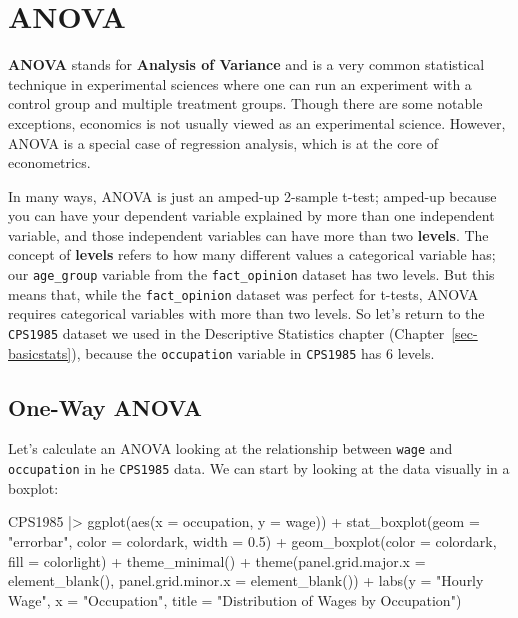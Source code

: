 \documentclass[
  letterpaper,
]{book}
\newenvironment{Shaded}{\begin{snugshade}}{\end{snugshade}}
\newcommand{\AttributeTok}[1]{\textcolor[rgb]{0.40,0.45,0.13}{#1}}
\newcommand{\FloatTok}[1]{\textcolor[rgb]{0.68,0.00,0.00}{#1}}
\newcommand{\FunctionTok}[1]{\textcolor[rgb]{0.28,0.35,0.67}{#1}}
\newcommand{\NormalTok}[1]{\textcolor[rgb]{0.00,0.23,0.31}{#1}}
\newcommand{\SpecialCharTok}[1]{\textcolor[rgb]{0.37,0.37,0.37}{#1}}
\newcommand{\StringTok}[1]{\textcolor[rgb]{0.13,0.47,0.30}{#1}}
\begin{document}
\section{ANOVA}\label{anova}

\textbf{ANOVA} stands for \textbf{Analysis of Variance} and is a very
common statistical technique in experimental sciences where one can run
an experiment with a control group and multiple treatment groups. Though
there are some notable exceptions, economics is not usually viewed as an
experimental science. However, ANOVA is a special case of regression
analysis, which is at the core of econometrics.

In many ways, ANOVA is just an amped-up 2-sample t-test; amped-up
because you can have your dependent variable explained by more than one
independent variable, and those independent variables can have more than
two \textbf{levels}. The concept of \textbf{levels} refers to how many
different values a categorical variable has; our \texttt{age\_group}
variable from the \texttt{fact\_opinion} dataset has two levels. But
this means that, while the \texttt{fact\_opinion} dataset was perfect
for t-tests, ANOVA requires categorical variables with more than two
levels. So let's return to the \texttt{CPS1985} dataset we used in the
Descriptive Statistics chapter (Chapter~\ref{sec-basicstats}), because
the \texttt{occupation} variable in \texttt{CPS1985} has 6 levels.

\subsection{One-Way ANOVA}\label{one-way-anova}

Let's calculate an ANOVA looking at the relationship between
\texttt{wage} and \texttt{occupation} in he \texttt{CPS1985} data. We
can start by looking at the data visually in a boxplot:

\begin{Shaded}
\begin{Highlighting}[]
\NormalTok{CPS1985 }\SpecialCharTok{|\textgreater{}} \FunctionTok{ggplot}\NormalTok{(}\FunctionTok{aes}\NormalTok{(}\AttributeTok{x =}\NormalTok{ occupation, }\AttributeTok{y =}\NormalTok{ wage)) }\SpecialCharTok{+}
  \FunctionTok{stat\_boxplot}\NormalTok{(}\AttributeTok{geom =} \StringTok{"errorbar"}\NormalTok{, }
               \AttributeTok{color =}\NormalTok{ colordark,}
               \AttributeTok{width =} \FloatTok{0.5}\NormalTok{) }\SpecialCharTok{+}
  \FunctionTok{geom\_boxplot}\NormalTok{(}\AttributeTok{color =}\NormalTok{ colordark, }
               \AttributeTok{fill =}\NormalTok{ colorlight) }\SpecialCharTok{+}
  \FunctionTok{theme\_minimal}\NormalTok{() }\SpecialCharTok{+}
  \FunctionTok{theme}\NormalTok{(}\AttributeTok{panel.grid.major.x =} \FunctionTok{element\_blank}\NormalTok{(),}
        \AttributeTok{panel.grid.minor.x =} \FunctionTok{element\_blank}\NormalTok{()) }\SpecialCharTok{+}
  \FunctionTok{labs}\NormalTok{(}\AttributeTok{y =} \StringTok{"Hourly Wage"}\NormalTok{, }
       \AttributeTok{x =} \StringTok{"Occupation"}\NormalTok{,}
       \AttributeTok{title =} \StringTok{"Distribution of Wages by Occupation"}\NormalTok{)}
\end{Highlighting}
\end{Shaded}
\end{document}
